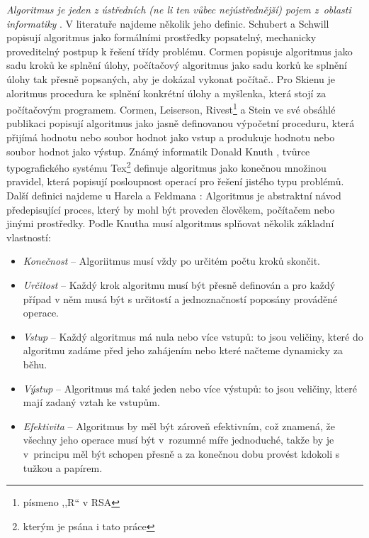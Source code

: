 \documentclass[FP,DP]{tulthesis}
\begin{document}
\textit {Algoritmus je jeden z ústředních (ne li ten vůbec nejústřednější) pojem z~oblasti informatiky} \citep*{didaktikderinformatik}. V literatuře najdeme několik jeho definic. Schubert a Schwill \citeyearpar[s.~4]{didaktikderinformatik} popisují algoritmus jako formálními prostředky popsatelný, mechanicky proveditelný postpup k řešení třídy problému. Cormen \citeyearpar[s.~1]{algunlocked} popisuje algoritmus jako sadu kroků ke splnění úlohy, počítačový algoritmus jako sadu korků ke splnění úlohy tak přesně popsaných, aby je dokázal vykonat počítač.. Pro Skienu \citeyearpar[s.~3]{algdesignman} je aloritmus procedura ke splnění konkrétní úlohy a myšlenka, která stojí za počítačovým programem. Cormen, Leiserson, Rivest\footnote{písmeno ,,R`` v RSA} a Stein \citeyearpar[s.~5]{intralg} ve své obsáhlé publikaci popisují algoritmus jako jasně definovanou výpočetní proceduru, která přijímá hodnotu nebo soubor hodnot jako vstup a produkuje hodnotu nebo soubor hodnot jako výstup. Známý informatik  Donald Knuth \citeyearpar[s.~5]{knuth}, tvůrce typografického systému Tex\footnote{kterým je psána i tato práce} definuje algoritmus jako konečnou množinou pravidel, která popisují posloupnost operací pro řešení jistého typu problémů. Další definici najdeme u Harela a Feldmana \citeyearpar[s.~XII]{spirit}: Algoritmus je abstraktní  návod předepisující proces, který by mohl být proveden člověkem, počítačem nebo jinými prostředky. 
Podle Knutha \citeyearpar[s.~4-6]{knuth} musí algoritmus splňovat několik základní vlastností:
 \begin{itemize}
\setlength\itemsep{0.1em}
\item \textit {Konečnost} -- Algoriitmus musí vždy po určitém počtu kroků skončit.
\item \textit {Určitost} -- Každý krok algoritmu musí být přesně definován a pro každý případ v něm musá být s určitostí a jednoznačností poposány prováděné operace.
\item \textit {Vstup} -- Každý algoritmus má nula nebo více vstupů: to jsou veličiny, které do algoritmu zadáme před jeho zahájením nebo které načteme dynamicky za běhu.
\item \textit {Výstup} -- Algoritmus má také jeden nebo více výstupů: to jsou veličiny, které mají zadaný vztah ke vstupům.
\item \textit {Efektivita} -- Algoritmus by měl být zároveň efektivním, což znamená, že všechny jeho operace musí být v~rozumné míře jednoduché, takže by je v~principu měl být schopen přesně a za konečnou dobu provést kdokoli s tužkou a papírem.
\end{itemize}
\end{document}
